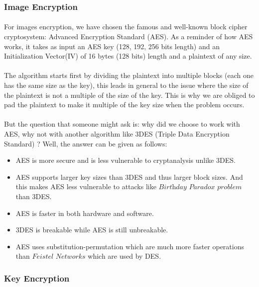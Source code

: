       \subsubsection{Image Encryption}
	\paragraph{}
	For images encryption, we have chosen the famous and well-known block cipher cryptosystem: Advanced Encryption Standard (AES). As a reminder of how AES works, it takes as input an AES key (128, 192, 256 bits length) and an Initialization Vector(IV) of 16 bytes (128 bits) length and a plaintext of any size.
	\paragraph{}
	The algorithm starts first by dividing the plaintext into multiple blocks (each one has the same size as the key), this leads in general to the issue where the size of the plaintext is not a multiple of the size of the key. This is why we are obliged to pad the plaintext to make it multiple of the key size when the problem occurs.
	\paragraph{}
	But the question that someone might ask is: why did we choose to work with AES, why not with another algorithm like 3DES (Triple Data Encryption Standard) ? Well, the answer can be given as follows:
	\begin{itemize}
	 \item AES is more secure and is less vulnerable to cryptanalysis unlike 3DES.
	 \item AES supports larger key sizes than 3DES and thus larger block sizes. And this makes AES less vulnerable to attacks like $\textit{Birthday Paradox problem}$ than 3DES.
	 \item AES is faster in both hardware and software.
	 \item 3DES is breakable while AES is still unbreakable.
	 \item AES uses substitution-permutation which are much more faster operations than $\textit{Feistel Networks}$ which are used by DES.
	\end{itemize}

	
	\subsubsection{Key Encryption}
